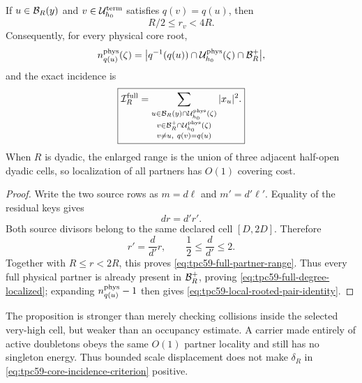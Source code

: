 \begin{proposition}
\label{prop:tpc59-full-partner-locality}
If \(u\in\mathcal B_R(y)\) and
\(v\in\mathcal U_{h_0}^{\rm term}\) satisfies \(q(v)=q(u)\), then
\begin{equation}
 \boxed{R/2\le r_v<4R.}
 \label{eq:tpc59-full-partner-range}
\end{equation}
Consequently, for every physical core root,
\begin{equation}
 n_{q(u)}^{\rm phys}(\zeta)
 =\bigl|q^{-1}(q(u))\cap
       \mathcal U_{h_0}^{\rm phys}(\zeta)\cap\mathcal B_R^+\bigr|,
 \label{eq:tpc59-full-degree-localized}
\end{equation}
and the exact incidence is
\begin{equation}
 \boxed{
 \mathcal I_R^{\rm full}
 =\sum_{\substack{u\in\mathcal B_R(y)\cap\mathcal U_{h_0}^{\rm phys}(\zeta)\\
                   v\in\mathcal B_R^+\cap\mathcal U_{h_0}^{\rm phys}(\zeta)\\
                   v\ne u,\ q(v)=q(u)}}|x_u|^2.}
 \label{eq:tpc59-local-rooted-pair-identity}
\end{equation}
When \(R\) is dyadic, the enlarged range is the union of three adjacent
half-open dyadic cells, so localization of all partners has \(O(1)\)
covering cost.
\end{proposition}

\begin{proof}
Write the two source rows as \(m=d\ell\) and \(m'=d'\ell'\).  Equality of
the residual keys gives
\begin{equation}
 dr=d'r'.
 \label{eq:tpc59-partner-factor-exchange}
\end{equation}
Both source divisors belong to the same declared cell
\([D,2D]\).  Therefore
\[
 r'=\frac d{d'}r,
 \qquad \frac12\le\frac d{d'}\le2.
\]
Together with \(R\le r<2R\), this proves
\eqref{eq:tpc59-full-partner-range}.  Thus every full physical partner is
already present in \(\mathcal B_R^+\), proving
\eqref{eq:tpc59-full-degree-localized}; expanding
\(n_{q(u)}^{\rm phys}-1\) then gives
\eqref{eq:tpc59-local-rooted-pair-identity}.
\end{proof}

The proposition is stronger than merely checking collisions inside the
selected very-high cell, but weaker than an occupancy estimate.  A carrier
made entirely of active doubletons obeys the same \(O(1)\) partner locality
and still has no singleton energy.  Thus bounded scale displacement does
not make \(\delta_R\) in
\eqref{eq:tpc59-core-incidence-criterion} positive.

